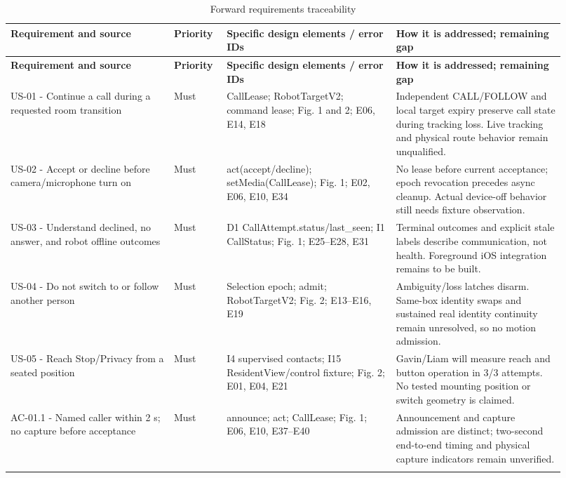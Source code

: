 \documentclass[12pt,letterpaper]{article}
\begin{document}
\begingroup\small
\begin{longtable}{@{}>{\RaggedRight\arraybackslash}p{0.27\linewidth}>{\RaggedRight\arraybackslash}p{0.08\linewidth}>{\RaggedRight\arraybackslash}p{0.28\linewidth}>{\RaggedRight\arraybackslash}p{0.285\linewidth}@{}}
\caption{Forward requirements traceability}\\
\toprule\textbf{Requirement and source} & \textbf{Priority} & \textbf{Specific design elements / error IDs} & \textbf{How it is addressed; remaining gap}\\\midrule\endfirsthead
\toprule\textbf{Requirement and source} & \textbf{Priority} & \textbf{Specific design elements / error IDs} & \textbf{How it is addressed; remaining gap}\\\midrule\endhead
\midrule\endfoot\bottomrule\endlastfoot
US-01 - Continue a call during a requested room transition & Must & CallLease; RobotTargetV2; command lease; Fig. 1 and 2; E06, E14, E18 & Independent CALL/FOLLOW and local target expiry preserve call state during tracking loss. Live tracking and physical route behavior remain unqualified. \\ \addlinespace[3pt]
US-02 - Accept or decline before camera/microphone turn on & Must & act(accept/decline); setMedia(CallLease); Fig. 1; E02, E06, E10, E34 & No lease before current acceptance; epoch revocation precedes async cleanup. Actual device-off behavior still needs fixture observation. \\ \addlinespace[3pt]
US-03 - Understand declined, no answer, and robot offline outcomes & Must & D1 CallAttempt.status/last\_\allowbreak{}seen; I1 CallStatus; Fig. 1; E25--E28, E31 & Terminal outcomes and explicit stale labels describe communication, not health. Foreground iOS integration remains to be built. \\ \addlinespace[3pt]
US-04 - Do not switch to or follow another person & Must & Selection epoch; admit; RobotTargetV2; Fig. 2; E13--E16, E19 & Ambiguity/loss latches disarm. Same-box identity swaps and sustained real identity continuity remain unresolved, so no motion admission. \\ \addlinespace[3pt]
US-05 - Reach Stop/Privacy from a seated position & Must & I4 supervised contacts; I15 ResidentView/control fixture; Fig. 2; E01, E04, E21 & Gavin/Liam will measure reach and button operation in 3/3 attempts. No tested mounting position or switch geometry is claimed. \\ \addlinespace[3pt]
AC-01.1 - Named caller within 2 s; no capture before acceptance & Must & announce; act; CallLease; Fig. 1; E06, E10, E37--E40 & Announcement and capture admission are distinct; two-second end-to-end timing and physical capture indicators remain unverified. \\ \addlinespace[3pt]

\end{longtable}
\end{document}
